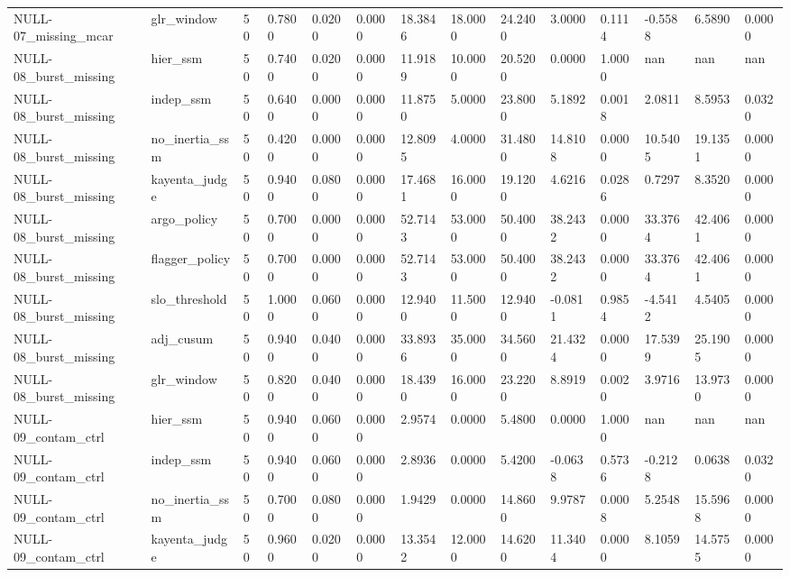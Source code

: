\begin{table}[htbp]
\begin{tabular}{llllllllllllll}
NULL-07\_missing\_mcar & glr\_window & 50 & 0.7800 & 0.0200 & 0.0000 & 18.3846 & 18.0000 & 24.2400 & 3.0000 & 0.1114 & -0.5588 & 6.5890 & 0.0000 \\
NULL-08\_burst\_missing & hier\_ssm & 50 & 0.7400 & 0.0200 & 0.0000 & 11.9189 & 10.0000 & 20.5200 & 0.0000 & 1.0000 & nan & nan & nan \\
NULL-08\_burst\_missing & indep\_ssm & 50 & 0.6400 & 0.0000 & 0.0000 & 11.8750 & 5.0000 & 23.8000 & 5.1892 & 0.0018 & 2.0811 & 8.5953 & 0.0320 \\
NULL-08\_burst\_missing & no\_inertia\_ssm & 50 & 0.4200 & 0.0000 & 0.0000 & 12.8095 & 4.0000 & 31.4800 & 14.8108 & 0.0000 & 10.5405 & 19.1351 & 0.0000 \\
NULL-08\_burst\_missing & kayenta\_judge & 50 & 0.9400 & 0.0800 & 0.0000 & 17.4681 & 16.0000 & 19.1200 & 4.6216 & 0.0286 & 0.7297 & 8.3520 & 0.0000 \\
NULL-08\_burst\_missing & argo\_policy & 50 & 0.7000 & 0.0000 & 0.0000 & 52.7143 & 53.0000 & 50.4000 & 38.2432 & 0.0000 & 33.3764 & 42.4061 & 0.0000 \\
NULL-08\_burst\_missing & flagger\_policy & 50 & 0.7000 & 0.0000 & 0.0000 & 52.7143 & 53.0000 & 50.4000 & 38.2432 & 0.0000 & 33.3764 & 42.4061 & 0.0000 \\
NULL-08\_burst\_missing & slo\_threshold & 50 & 1.0000 & 0.0600 & 0.0000 & 12.9400 & 11.5000 & 12.9400 & -0.0811 & 0.9854 & -4.5412 & 4.5405 & 0.0000 \\
NULL-08\_burst\_missing & adj\_cusum & 50 & 0.9400 & 0.0400 & 0.0000 & 33.8936 & 35.0000 & 34.5600 & 21.4324 & 0.0000 & 17.5399 & 25.1905 & 0.0000 \\
NULL-08\_burst\_missing & glr\_window & 50 & 0.8200 & 0.0400 & 0.0000 & 18.4390 & 16.0000 & 23.2200 & 8.8919 & 0.0020 & 3.9716 & 13.9730 & 0.0000 \\
NULL-09\_contam\_ctrl & hier\_ssm & 50 & 0.9400 & 0.0600 & 0.0000 & 2.9574 & 0.0000 & 5.4800 & 0.0000 & 1.0000 & nan & nan & nan \\
NULL-09\_contam\_ctrl & indep\_ssm & 50 & 0.9400 & 0.0600 & 0.0000 & 2.8936 & 0.0000 & 5.4200 & -0.0638 & 0.5736 & -0.2128 & 0.0638 & 0.0320 \\
NULL-09\_contam\_ctrl & no\_inertia\_ssm & 50 & 0.7000 & 0.0800 & 0.0000 & 1.9429 & 0.0000 & 14.8600 & 9.9787 & 0.0008 & 5.2548 & 15.5968 & 0.0000 \\
NULL-09\_contam\_ctrl & kayenta\_judge & 50 & 0.9600 & 0.0200 & 0.0000 & 13.3542 & 12.0000 & 14.6200 & 11.3404 & 0.0000 & 8.1059 & 14.5755 & 0.0000 \\

\end{tabular}
\end{table}
